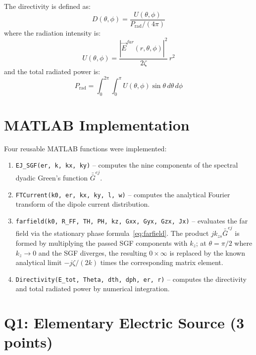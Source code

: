 \documentclass{article}
\begin{document}
The directivity is defined as:
\begin{equation}\label{eq:directivity}
D(\theta,\phi) = \frac{U(\theta,\phi)}{P_{\text{rad}}/(4\pi)}
\end{equation}
where the radiation intensity is:
\begin{equation}\label{eq:radintensity}
U(\theta,\phi) = \frac{|\vec{E}^{far}(r,\theta,\phi)|^2}{2\zeta}\,r^2
\end{equation}
and the total radiated power is:
\begin{equation}\label{eq:prad}
P_{\text{rad}} = \int_0^{2\pi}\int_0^{\pi} U(\theta,\phi)\sin\theta\,d\theta\,d\phi
\end{equation}

\section{MATLAB Implementation}

Four reusable MATLAB functions were implemented:

\begin{enumerate}
\item \texttt{EJ\_SGF(er, k, kx, ky)} -- computes the nine components of the spectral dyadic Green's function $\bar{\bar{G}}^{ej}$.
\item \texttt{FTCurrent(k0, er, kx, ky, l, w)} -- computes the analytical Fourier transform of the dipole current distribution.
\item \texttt{farfield(k0, R\_FF, TH, PH, kz, Gxx, Gyx, Gzx, Jx)} -- evaluates the far field via the stationary phase formula~\eqref{eq:farfield}. The product $jk_{zs}\bar{\bar{G}}^{ej}$ is formed by multiplying the passed SGF components with $k_z$; at $\theta=\pi/2$ where $k_z\to 0$ and the SGF diverges, the resulting $0\times\infty$ is replaced by the known analytical limit $-j\zeta/(2k)$ times the corresponding matrix element.
\item \texttt{Directivity(E\_tot, Theta, dth, dph, er, r)} -- computes the directivity and total radiated power by numerical integration.
\end{enumerate}

\section{Q1: Elementary Electric Source (3 points)}
\end{document}

